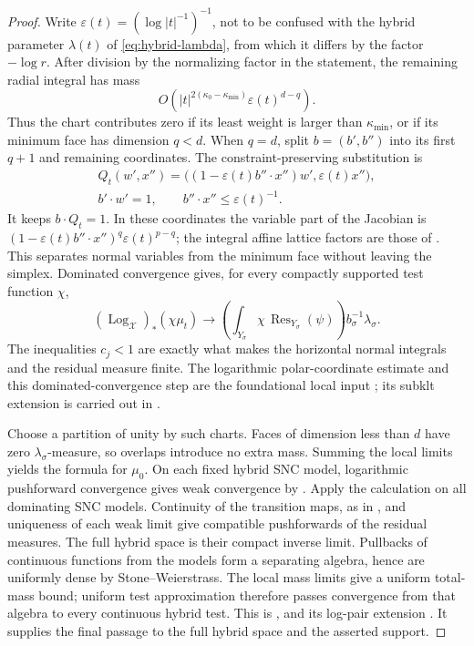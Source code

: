 \begin{proof}
Write $\varepsilon(t)=(\log|t|^{-1})^{-1}$, not to be confused with the
hybrid parameter $\lambda(t)$ of \eqref{eq:hybrid-lambda}, from which it
differs by the factor $-\log r$.  After division by the
normalizing factor in the statement, the remaining radial integral has
mass
\[
 O\!\left(
   |t|^{2(\kappa_0-\kappa_{\min})}
   \varepsilon(t)^{d-q}\right).
\]
Thus the chart contributes zero if its least weight is larger than
$\kappa_{\min}$, or if its minimum face has dimension $q<d$.
When $q=d$, split $b=(b',b'')$ into its first $q+1$ and remaining
coordinates. The constraint-preserving substitution is
\[
\begin{gathered}
 Q_t(w',x'')=
 \bigl((1-\varepsilon(t)b''\!\cdot x'')w',\varepsilon(t)x''\bigr),\\
 b'\!\cdot w'=1,\qquad b''\!\cdot x''\leq\varepsilon(t)^{-1}.
\end{gathered}
\tag{66.34b}\label{eq:hybrid-residue-change-variables}
\]
It keeps $b\cdot Q_t=1$. In these coordinates the variable part of the
Jacobian is $(1-\varepsilon(t)b''\cdot x'')^q\varepsilon(t)^{p-q}$;
the integral affine lattice factors are those of
\cite[Lemma~3.8]{BJ17Hybrid}. This separates normal variables from the
minimum face without leaving the simplex.  Dominated
convergence gives, for every compactly supported test function $\chi$,
\[
 (\operatorname{Log}_{\mathcal X})_*(\chi\mu_t)
 \longrightarrow
 \left(\int_{Y_\sigma}
       \chi\,\operatorname{Res}_{Y_\sigma}(\psi)\right)
 b_\sigma^{-1}\lambda_\sigma .
\]
The inequalities $c_j<1$ are exactly what makes the horizontal normal
integrals and the residual measure finite.  The logarithmic
polar-coordinate estimate
and this dominated-convergence step are the foundational local input
\cite[Lemma~3.5]{BJ17Hybrid}; its subklt extension is carried out in
\cite[Theorem~8.4]{BJ17Hybrid}.

Choose a partition of unity by such charts.  Faces of dimension less than
$d$ have zero $\lambda_\sigma$-measure, so overlaps introduce no
extra mass.  Summing the local limits yields the formula for $\mu_0$.
On each fixed hybrid SNC model, logarithmic pushforward convergence
gives weak convergence by \cite[Theorem~3.4 and Lemma~3.6]{BJ17Hybrid}.
Apply the calculation on all dominating SNC models. Continuity of the
transition maps, as in \cite[Proposition~4.8]{BJ17Hybrid}, and uniqueness of
each weak limit give compatible pushforwards of the residual measures.
The full hybrid space is their compact
inverse limit. Pullbacks of continuous functions from the models form a
separating algebra, hence are uniformly dense by Stone--Weierstrass.
The local mass limits give a uniform total-mass bound; uniform test
approximation therefore passes convergence from that algebra to every
continuous hybrid test. This is \cite[Corollary~4.11]{BJ17Hybrid}, and its
log-pair extension \cite[Theorem~8.4]{BJ17Hybrid}. It supplies the final
passage to the full hybrid space and the asserted support.
\end{proof}

